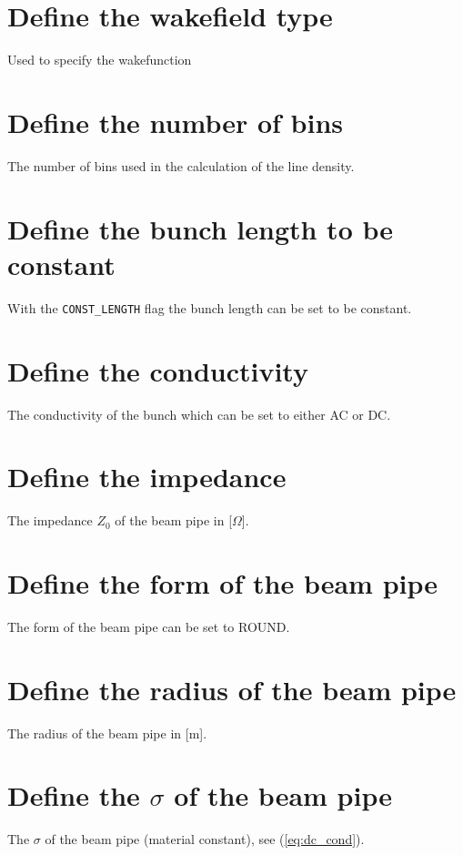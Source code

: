 \section{Define the wakefield type}
\label{sec:WTYPE}
Used to specify the wakefunction

\section{Define the number of bins}
\label{sec:NBIN}
The number of bins used in the calculation of the line density.

\section{Define the bunch length to be constant}
\label{sec:CONSTLEN}
With the \texttt{CONST\_LENGTH} flag the bunch length can be set to be constant.

\section{Define the conductivity}
\label{sec:CONDUCT}
The conductivity of the bunch which can be set to either AC or DC.

\section{Define the impedance}
\label{sec:Z}
The impedance $Z_0$ of the beam pipe in [$\Omega$].

\section{Define the form of the beam pipe}
\label{sec:FROM}
The form of the beam pipe can be set to ROUND.

\section{Define the radius of the beam pipe}
\label{sec:RADIUS}
The radius of the beam pipe in [m].

\section{Define the $\sigma$ of the beam pipe}
\label{sec:SIGMA}
The $\sigma$ of the beam pipe (material constant), see (\ref{eq:dc_cond}).

